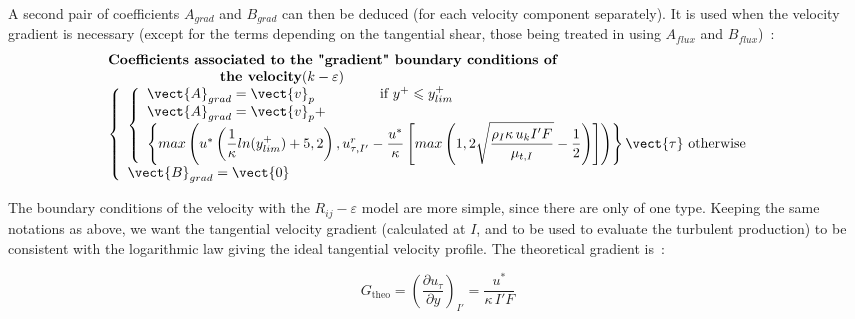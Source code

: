 A second pair of coefficients $A_{grad}$ and $B_{grad}$ can then be deduced 
(for each velocity component separately). It is used when the velocity
gradient is necessary (except for the terms depending on the tangential shear,
those being treated in  using $A_{flux}$ and $B_{flux}$)~: 
\begin{equation}
\begin{array}{l}
\text{\bf Coefficients associated to the "gradient" boundary conditions of }\\
\qquad\qquad\qquad\qquad\text{\bf the velocity}  (k-\varepsilon)\\
\left\{\begin{array}{l}
\left\{\begin{array}{l}
\vect{A}_{grad}=\vect{v}_p
                    \qquad\qquad\text{ \ if\ } y^+\leqslant y^+_{lim} \\
\vect{A}_{grad}=\vect{v}_p+\\
\left\{
max\left(u^*\left(\displaystyle\frac{1}{\kappa}ln(y^+_{lim})+5,2\right),
u^r_{\tau,I'}-\displaystyle\frac{u^*}{\kappa}\left[max\left(1,
2\sqrt{\displaystyle\frac{\rho_I\kappa\, u_k I'F}{\mu_{t,I}}
}-\displaystyle\frac{1}{2}\right)\right]\right)
\right\}\vect{\tau}
    \text{ otherwise }
\end{array}\right.  \\
\vect{B}_{grad} = \vect{0}
\end{array}\right.
\end{array}
\end{equation}


The boundary conditions of the velocity with the  $R_{ij}-\varepsilon$ model are 
more simple, since there are only of one type.
Keeping the same notations as above, we want the tangential velocity gradient 
(calculated at $I$, and to be used to evaluate the turbulent production)
to be consistent with the logarithmic law giving the ideal tangential 
velocity profile. The theoretical gradient is~:

\begin{equation}\label{Base_Clptur_eq_grad_theo_clptur}
G_{\text{theo}} = \left(\displaystyle\frac{\partial u_\tau}{\partial y}\right)_{I'}=\frac{u^*}{\kappa\, I'F}
\end{equation}

